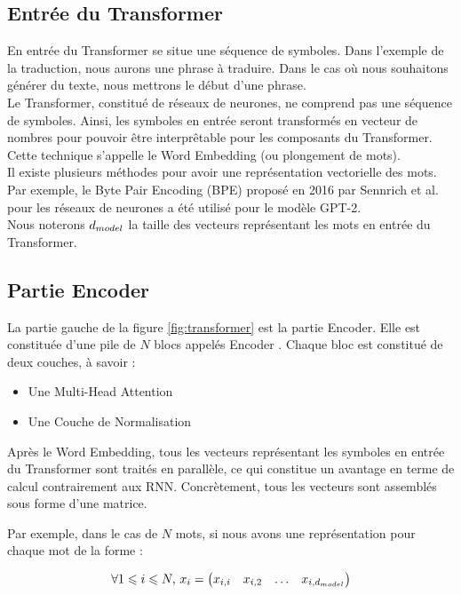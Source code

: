 \subsection{Entrée du Transformer}

En entrée du Transformer se situe une séquence de symboles. Dans l'exemple de la traduction, nous aurons une phrase à traduire.
Dans le cas où nous souhaitons générer du texte, nous mettrons le début d'une phrase. \\

Le Transformer, constitué de réseaux de neurones, ne comprend pas une séquence de symboles. Ainsi, les symboles en entrée seront transformés en vecteur
de nombres pour pouvoir être interprêtable pour les composants du Transformer. Cette technique s'appelle le Word Embedding (ou plongement de mots). \\

Il existe plusieurs méthodes pour avoir une représentation vectorielle des mots. 
Par exemple, le Byte Pair Encoding (BPE)\cite{sennrich2016bpe} proposé en 2016 par Sennrich et al. pour 
les réseaux de neurones a été utilisé pour le modèle GPT-2\cite{radford2019gpt2}. \\

Nous noterons $d_{model}$ la taille des vecteurs représentant les mots en entrée du Transformer.

\subsection{Partie Encoder}

La partie gauche de la figure \ref{fig:transformer} est la partie Encoder. Elle est constituée d'une pile de $N$ blocs appelés \og Encoder \fg{}.
Chaque bloc est constitué de deux couches, à savoir :
\begin{itemize}
\item Une Multi-Head Attention
\item Une Couche de Normalisation
\end{itemize}

Après le Word Embedding, tous les vecteurs représentant les symboles en entrée du Transformer sont traités en parallèle, 
ce qui constitue un avantage en terme de calcul contrairement aux RNN. Concrètement, tous les vecteurs sont assemblés sous forme d'une matrice.

Par exemple, dans le cas de $N$ mots, si nous avons une représentation pour chaque mot de la forme : 

\[ \forall 1 \leqslant i \leqslant N , \, x_i = 
\begin{pmatrix}
  x_{i,i} & x_{i,2} & \ldots & x_{i,d_{model}}
\end{pmatrix}
 \]

